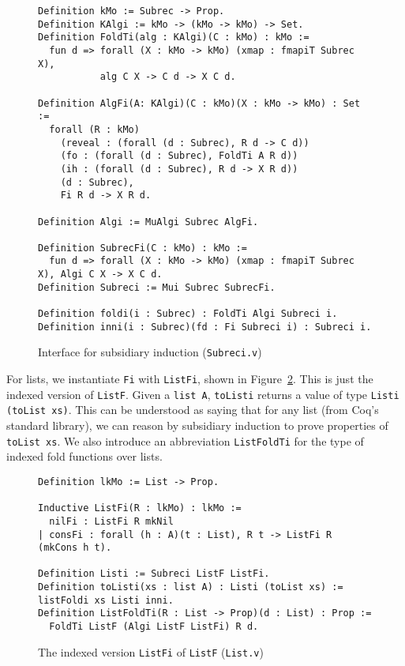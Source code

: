 \documentclass[a4paper,USenglish]{lipics-v2021}
\begin{document}
\begin{figure}
\begin{verbatim}
Definition kMo := Subrec -> Prop.
Definition KAlgi := kMo -> (kMo -> kMo) -> Set.
Definition FoldTi(alg : KAlgi)(C : kMo) : kMo :=
  fun d => forall (X : kMo -> kMo) (xmap : fmapiT Subrec X), 
           alg C X -> C d -> X C d.

Definition AlgFi(A: KAlgi)(C : kMo)(X : kMo -> kMo) : Set :=
  forall (R : kMo)
    (reveal : (forall (d : Subrec), R d -> C d))        
    (fo : (forall (d : Subrec), FoldTi A R d))
    (ih : (forall (d : Subrec), R d -> X R d))
    (d : Subrec),
    Fi R d -> X R d.

Definition Algi := MuAlgi Subrec AlgFi.

Definition SubrecFi(C : kMo) : kMo := 
  fun d => forall (X : kMo -> kMo) (xmap : fmapiT Subrec X), Algi C X -> X C d.
Definition Subreci := Mui Subrec SubrecFi.

Definition foldi(i : Subrec) : FoldTi Algi Subreci i.
Definition inni(i : Subrec)(fd : Fi Subreci i) : Subreci i.
\end{verbatim}
\caption{Interface for subsidiary induction (\texttt{Subreci.v})}
\label{fig:subreci}
\end{figure}

For lists, we instantiate \verb|Fi| with \verb|ListFi|, shown in
Figure~\ref{fig:listfi}.  This is just the indexed version of
\verb|ListF|.  Given a \verb|list A|, \verb|toListi| returns
a value of type \verb|Listi (toList xs)|.  This can be understood
as saying that for any list (from Coq's standard library),
we can reason by subsidiary induction to prove properties of \verb|toList xs|.
We also introduce an abbreviation \verb|ListFoldTi| for the type
of indexed fold functions over lists.

\begin{figure}
\begin{verbatim}
Definition lkMo := List -> Prop.

Inductive ListFi(R : lkMo) : lkMo :=
  nilFi : ListFi R mkNil
| consFi : forall (h : A)(t : List), R t -> ListFi R (mkCons h t).

Definition Listi := Subreci ListF ListFi.
Definition toListi(xs : list A) : Listi (toList xs) := listFoldi xs Listi inni.
Definition ListFoldTi(R : List -> Prop)(d : List) : Prop :=
  FoldTi ListF (Algi ListF ListFi) R d.
\end{verbatim}
\caption{The indexed version \texttt{ListFi} of \texttt{ListF} (\texttt{List.v})}
\label{fig:listfi}
\end{figure}
\end{document}
